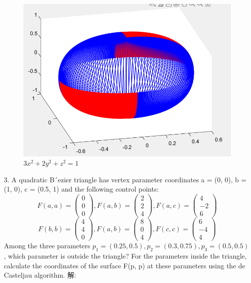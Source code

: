 \documentclass{article}
\begin{document}
	
	\begin{figure}[H]
		\centering
		\includegraphics[scale=0.6]{2}
		\caption{$3x^2+2y^2+z^2=1$}
		\label{fig:2}
	\end{figure}

	3. A quadratic B´ezier triangle has vertex parameter coordinates a = (0, 0), b = (1, 0),
	c = (0.5, 1) and the following control points:
$$F(a,a)=\left(\begin{array}{c}	0\\0\\0 \end{array}\right),F(a,b)=\left(\begin{array}{c}	2\\2\\4 \end{array}\right),F(a,c)=\left(\begin{array}{c}	4\\-2\\6 \end{array}\right)$$
$$F(b,b)=\left(\begin{array}{c}	4\\4\\0 \end{array}\right),F(a,b)=\left(\begin{array}{c}	8\\0\\4 \end{array}\right),F(c,c)=\left(\begin{array}{c}	6\\-4\\4 \end{array}\right)$$
	Among the three parameters $p_1 = (0.25, 0.5), p_2 = (0.3, 0.75), p_3 = (0.5, 0.5)$, which parameter
	is outside the triangle? For the parameters inside the triangle, calculate the coordinates of
	the surface F(p, p) at these parameters using the de Casteljau algorithm.
	解:
	
\end{document}
